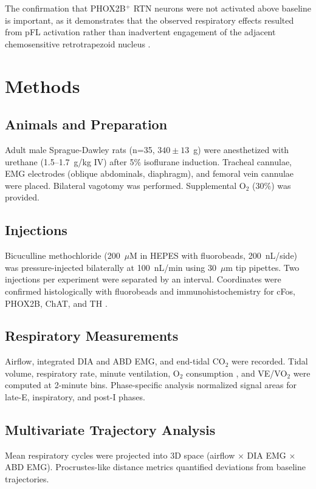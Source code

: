 \documentclass[11pt]{article}
\begin{document}
The confirmation that PHOX2B$^+$ RTN neurons were not activated above baseline is important, as it demonstrates that the observed respiratory effects resulted from pFL activation rather than inadvertent engagement of the adjacent chemosensitive retrotrapezoid nucleus \citep{guyenet2010retrotrapezoid, de2022phox2b}.

\section{Methods}

\subsection{Animals and Preparation}
Adult male Sprague-Dawley rats (n=35, $340 \pm 13$~g) were anesthetized with urethane (1.5--1.7~g/kg IV) after 5\% isoflurane induction. Tracheal cannulae, EMG electrodes (oblique abdominals, diaphragm), and femoral vein cannulae were placed. Bilateral vagotomy was performed. Supplemental O$_2$ (30\%) was provided.

\subsection{Injections}
Bicuculline methochloride (200~$\mu$M in HEPES with fluorobeads, 200~nL/side) was pressure-injected bilaterally at 100~nL/min using 30~$\mu$m tip pipettes. Two injections per experiment were separated by an interval. Coordinates were confirmed histologically with fluorobeads and immunohistochemistry for cFos, PHOX2B, ChAT, and TH \citep{paxinos2007rat}.

\subsection{Respiratory Measurements}
Airflow, integrated DIA and ABD EMG, and end-tidal CO$_2$ were recorded. Tidal volume, respiratory rate, minute ventilation, O$_2$ consumption \citep{depocas1957rate}, and VE/VO$_2$ were computed at 2-minute bins. Phase-specific analysis normalized signal areas for late-E, inspiratory, and post-I phases.

\subsection{Multivariate Trajectory Analysis}
Mean respiratory cycles were projected into 3D space (airflow $\times$ DIA EMG $\times$ ABD EMG). Procrustes-like distance metrics quantified deviations from baseline trajectories.
\end{document}
